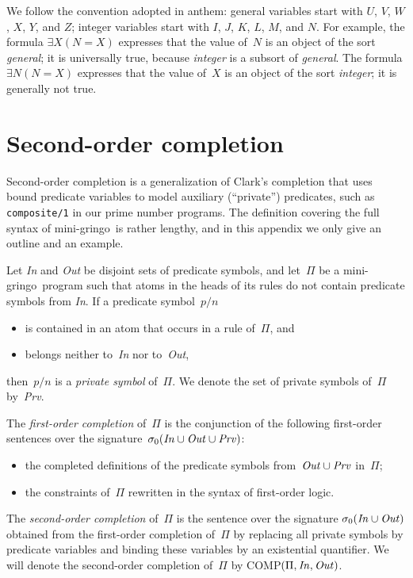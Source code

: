 \documentclass{new_tlp}
\def\gringo{{\sc gringo}}
\begin{document}
We follow the convention adopted in {\sc anthem\/}:
general variables start with $U$, $V$, $W$, $X$, $Y$, and $Z$;
integer variables start with $I$, $J$, $K$, $L$, $M$, and $N$.
For example, the formula
$\exists X (N=X)$ expresses that the value of~$N$ is an object of the sort
\emph{general\/};  it is universally true, because \emph{integer} is a
subsort of \emph{general}.  The formula
$\exists N (N=X)$ expresses that the value of~$X$ is an object of the sort
\emph{integer\/}; it is generally not true.

\section{Second-order completion} \label{appb}

Second-order completion \cite[Sections~6.1,~6.2]{fan20}
is a generalization of Clark's completion
that uses bound predicate variables to model auxiliary
(``private'') predicates, such as \verb|composite/1| in our prime number
programs.  The definition covering the full
syntax of mini-\gringo\ is rather lengthy, and in this appendix we only give
an outline and an example.

Let \emph{In} and \emph{Out} be disjoint sets of predicate symbols, and
let~$\Pi$ be a mini-\gringo\ program such that atoms in the heads of
its rules do not contain predicate symbols from \emph{In}.
If a predicate symbol~$p/n$
\begin{itemize}
\item is contained in an atom that occurs in a rule of~$\Pi$, and
\item belongs neither to~\emph{In} nor to~\emph{Out},
\end{itemize}
then~$p/n$ is a \emph{private symbol} of~$\Pi$.  We denote the
set of private symbols of~$\Pi$ by~\emph{Prv}.

The \emph{first-order completion} of~$\Pi$ is the conjunction of the following
first-order sentences over the
signature~$\sigma_0(\emph{In\/}\cup\emph{Out\/}\cup\emph{Prv\/})$:
\begin{itemize}
\item the completed definitions of the predicate symbols
  from~$\emph{Out\/}\cup\emph{Prv\/}$ in~$\Pi$;
\item the constraints of~$\Pi$ rewritten in the syntax of first-order
  logic.
\end{itemize}
The \emph{second-order completion} of~$\Pi$ is the sentence
over the signature $\sigma_0(\emph{In\/}\cup\emph{Out\/})$ obtained from
the first-order completion of~$\Pi$ by replacing all private symbols by
predicate variables and binding these variables by an existential quantifier.
We will denote the second-order completion of~$\Pi$ by
COMP$(\Pi,\emph{In\/},\emph{Out\/})$.
\end{document}

